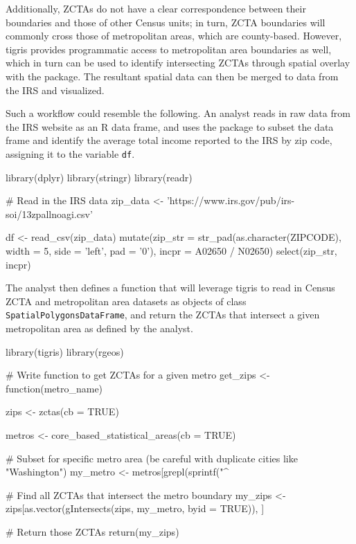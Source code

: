 Additionally, ZCTAs do not have a clear correspondence between their
boundaries and those of other Census units; in turn, ZCTA boundaries
will commonly cross those of metropolitan areas, which are county-based.
However, tigris provides programmatic access to metropolitan area
boundaries as well, which in turn can be used to identify intersecting
ZCTAs through spatial overlay with the  package. The
resultant spatial data can then be merged to data from the IRS and
visualized.

Such a workflow could resemble the following. An analyst reads in raw
data from the IRS website as an R data frame, and uses the
 package to subset the data frame and identify the
average total income reported to the IRS by zip code, assigning it to
the variable \texttt{df}.

\begin{Schunk}
\begin{Sinput}
library(dplyr)
library(stringr)
library(readr)

# Read in the IRS data
zip_data <- 'https://www.irs.gov/pub/irs-soi/13zpallnoagi.csv'

df <- read_csv(zip_data) %
  mutate(zip_str = str_pad(as.character(ZIPCODE), width = 5, side = 'left', pad = '0'), 
         incpr = A02650 / N02650) %
  select(zip_str, incpr)
\end{Sinput}
\end{Schunk}

The analyst then defines a function that will leverage tigris to read in
Census ZCTA and metropolitan area datasets as objects of class
\texttt{SpatialPolygonsDataFrame}, and return the ZCTAs that intersect a
given metropolitan area as defined by the analyst.

\begin{Schunk}
\begin{Sinput}
library(tigris)
library(rgeos)

# Write function to get ZCTAs for a given metro
get_zips <- function(metro_name) {
  
  zips <- zctas(cb = TRUE)
  
  metros <- core_based_statistical_areas(cb = TRUE)
  
  # Subset for specific metro area (be careful with duplicate cities like "Washington")
  my_metro <- metros[grepl(sprintf("\^%
  
  # Find all ZCTAs that intersect the metro boundary
  my_zips <- zips[as.vector(gIntersects(zips, my_metro, byid = TRUE)), ]
  
  # Return those ZCTAs
  return(my_zips)

}
\end{Sinput}
\end{Schunk}

